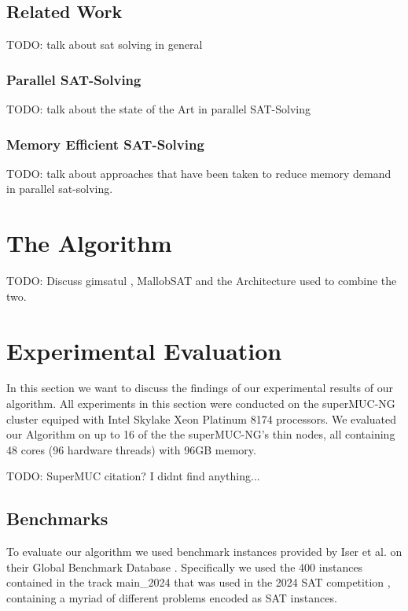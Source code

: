 \documentclass[12pt,a4paper,twoside]{scrartcl}
\numberwithin{equation}{section}
\begin{document}
\subsection{Related Work}

TODO: talk about sat solving in general

\subsubsection{Parallel SAT-Solving}

TODO: talk about the state of the Art in parallel SAT-Solving

\subsubsection{Memory Efficient SAT-Solving}

TODO: talk about approaches that have been taken to reduce memory demand in parallel sat-solving.


\section{The Algorithm}

TODO: Discuss gimsatul \cite{gimsatul}, MallobSAT \cite{dominikPhd} and the Architecture used to combine the two.


\newpage
\section{Experimental Evaluation}

In this section we want to discuss the findings of our experimental results of our algorithm. All experiments in this section were conducted on the superMUC-NG cluster equiped with Intel Skylake Xeon Platinum 8174 processors. We evaluated our Algorithm on up to 16 of the the superMUC-NG's thin nodes, all containing 48 cores (96 hardware threads) with 96GB memory.

TODO: SuperMUC citation? I didnt find anything...

\subsection{Benchmarks}
To evaluate our algorithm we used benchmark instances provided by Iser et al. on their Global Benchmark Database \cite{benchmarkDB}. Specifically we used the 400 instances contained in the track main\_2024 that was used in the 2024 SAT competition \cite{satComp2024}, containing a myriad of different problems encoded as SAT instances.
\end{document}
